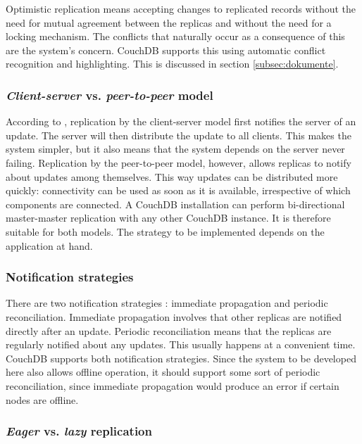 Optimistic replication means accepting changes to replicated records without the need for mutual agreement between the replicas and without the need for a locking mechanism. The conflicts that naturally occur as a consequence of this are the system's concern. CouchDB supports this using automatic conflict recognition and highlighting. This is discussed in section \ref{subsec:dokumente}.


\subsubsection{\textit{Client-server} vs. \textit{peer-to-peer} model}

According to , replication by the client-server model first notifies the server of an update. The server will then distribute the update to all clients. This makes the system simpler, but it also means that the system depends on the server never failing. Replication by the peer-to-peer model, however, allows replicas to notify about updates among themselves. This way updates can be distributed more quickly: connectivity can be used as soon as it is available, irrespective of which components are connected. A CouchDB installation can perform bi-directional master-master replication with any other CouchDB instance. It is therefore suitable for both models. The strategy to be implemented depends on the application at hand.

\subsubsection{Notification strategies}

There are two notification strategies : immediate propagation and periodic reconciliation. Immediate propagation involves that other replicas are notified directly after an update. Periodic reconciliation means that the replicas are regularly notified about any updates. This usually happens at a convenient time. CouchDB supports both notification strategies. Since the system to be developed here also allows offline operation, it should support some sort of periodic reconciliation, since immediate propagation would produce an error if certain nodes are offline.

\subsubsection{\textit{Eager} vs. \textit{lazy} replication}

